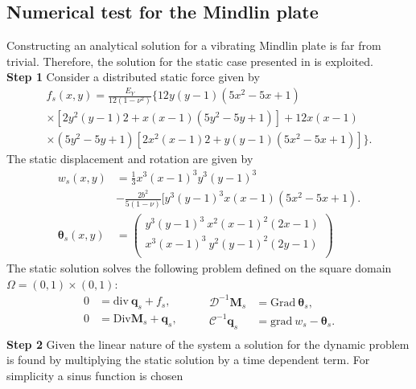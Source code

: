 \documentclass{ifacconf}
\begin{document}
\subsection{Numerical test for the Mindlin plate}
Constructing an analytical solution for a vibrating Mindlin plate is far from trivial. Therefore, the solution for the static case presented in \cite{mindlinVeiga} is exploited. \\
\textbf{Step 1 } Consider a distributed static force given by 
\begin{equation*}
\begin{aligned}
f_s(x,y)=\frac{E_Y}{12 (1-\nu^2)} \{12 y(y-1)(5x^2-5x+1)\\
\times [2y^2(y-1)2+x(x-1)(5y^2-5y+1)] +12x(x-1)\\
\times (5y^2-5y+1)[2x^2(x-1)2+y(y-1)(5x^2-5x+1)]\}.
\end{aligned}
\end{equation*}
The static displacement and rotation are given by
\begin{align*}
	w_s(x,y) &= \frac{1}{3} x^3(x-1)^3 y^3 (y-1)^3\\
	&-\frac{2 b^2}{5(1-\nu)}[y^3(y-1)^3 x(x-1)(5 x^2-5x+1). \\
	\bm{\theta}_{s}(x,y) &= 
	\begin{pmatrix}
	y^3(y-1)^3 \ x^2 (x-1)^2 (2x-1) \\
	x^3(x-1)^3 \ y^2 (y-1)^2 (2y-1) \\
	\end{pmatrix}
\end{align*}
The static solution solves the following problem defined on the square domain $\Omega=(0,1)\times(0,1)$:
\begin{equation}
\begin{aligned}
0 &= \mathrm{div} \ \bm{q}_s + f_s , \\
0 &= \mathrm{Div} \bm{M}_s + \bm{q}_s, \\
\end{aligned} \qquad
\begin{aligned}
\mathcal{D}^{-1} \bm{M}_s &= \mathrm{Grad} \ \bm{\theta}_s, \\
\mathcal{C}^{-1} \bm{q}_s &= \mathrm{grad} \ w_s - \bm{\theta}_s. \\
\end{aligned}
\end{equation}
\textbf{Step 2 } Given the linear nature of the system a solution for the dynamic problem is found by multiplying the static solution by a time dependent term. For simplicity a sinus function is chosen
\end{document}
